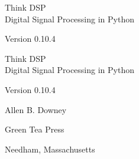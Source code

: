 \documentclass[12pt]{book}
\newcommand{\theversion}{0.10.4}
\begin{document}
\begin{latexonly}

\renewcommand{\blankpage}{\thispagestyle{empty} \quad \newpage}


\thispagestyle{empty}

\begin{flushright}
\vspace*{2.0in}

\begin{spacing}{3}
{\huge Think DSP}\\
{\Large Digital Signal Processing in Python}
\end{spacing}

\vspace{0.25in}

Version \theversion

\vfill

\end{flushright}


\blankpage
\blankpage

\pagebreak
\thispagestyle{empty}

\begin{flushright}
\vspace*{2.0in}

\begin{spacing}{3}
{\huge Think DSP}\\
{\Large Digital Signal Processing in Python}
\end{spacing}

\vspace{0.25in}

Version \theversion

\vspace{1in}


{\Large
Allen B. Downey\\
}


\vspace{0.5in}

{\Large Green Tea Press}

{\small Needham, Massachusetts}

\vfill

\end{flushright}


\pagebreak
\thispagestyle{empty}


\end{latexonly}
\end{document}
